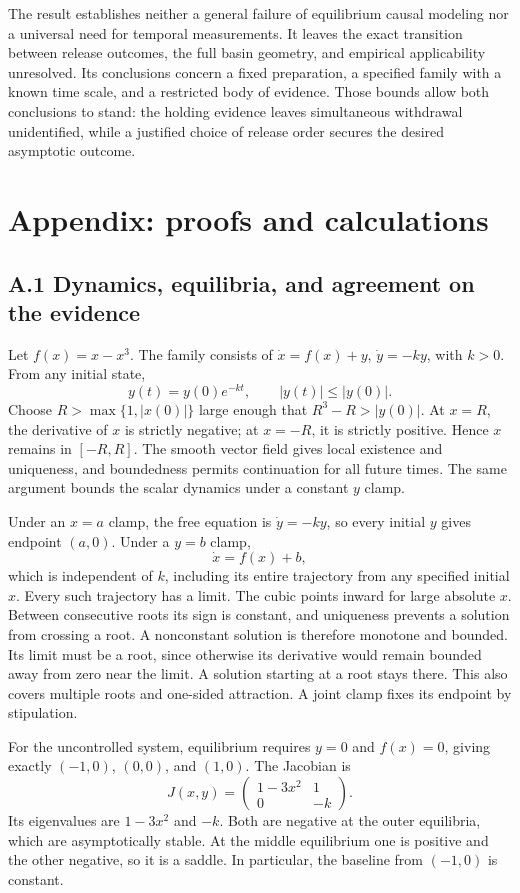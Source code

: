 The result establishes neither a general failure of equilibrium causal modeling nor a universal need for temporal measurements. It leaves the exact transition between release outcomes, the full basin geometry, and empirical applicability unresolved. Its conclusions concern a fixed preparation, a specified family with a known time scale, and a restricted body of evidence. Those bounds allow both conclusions to stand: the holding evidence leaves simultaneous withdrawal unidentified, while a justified choice of release order secures the desired asymptotic outcome.

\clearpage\section*{Appendix: proofs and calculations}

\subsection*{A.1 Dynamics, equilibria, and agreement on the evidence}\label{app:a.1}

Let \(f(x)=x-x^3\). The family consists of \(\dot x=f(x)+y\), \(\dot y=-ky\), with \(k>0\). From any initial state,
\[
y(t)=y(0)e^{-kt},\qquad |y(t)|\leq |y(0)|.
\]
Choose \(R>\max\{1,|x(0)|\}\) large enough that \(R^3-R>|y(0)|\). At \(x=R\), the derivative of \(x\) is strictly negative; at \(x=-R\), it is strictly positive. Hence \(x\) remains in \([-R,R]\). The smooth vector field gives local existence and uniqueness, and boundedness permits continuation for all future times. The same argument bounds the scalar dynamics under a constant \(y\) clamp.

Under an \(x=a\) clamp, the free equation is \(\dot y=-ky\), so every initial \(y\) gives endpoint \((a,0)\). Under a \(y=b\) clamp,
\[
\dot x=f(x)+b,
\]
which is independent of \(k\), including its entire trajectory from any specified initial \(x\). Every such trajectory has a limit. The cubic points inward for large absolute \(x\). Between consecutive roots its sign is constant, and uniqueness prevents a solution from crossing a root. A nonconstant solution is therefore monotone and bounded. Its limit must be a root, since otherwise its derivative would remain bounded away from zero near the limit. A solution starting at a root stays there. This also covers multiple roots and one-sided attraction. A joint clamp fixes its endpoint by stipulation.

For the uncontrolled system, equilibrium requires \(y=0\) and \(f(x)=0\), giving exactly \((-1,0)\), \((0,0)\), and \((1,0)\). The Jacobian is
\[
J(x,y)=\begin{pmatrix}1-3x^2&1\\0&-k\end{pmatrix}.
\]
Its eigenvalues are \(1-3x^2\) and \(-k\). Both are negative at the outer equilibria, which are asymptotically stable. At the middle equilibrium one is positive and the other negative, so it is a saddle. In particular, the baseline from \((-1,0)\) is constant.

